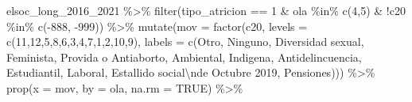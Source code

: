 \documentclass[
  12pt,
]{book}
\newenvironment{Shaded}{\begin{snugshade}}{\end{snugshade}}
\newcommand{\AttributeTok}[1]{\textcolor[rgb]{0.77,0.63,0.00}{#1}}
\newcommand{\ConstantTok}[1]{\textcolor[rgb]{0.00,0.00,0.00}{#1}}
\newcommand{\DecValTok}[1]{\textcolor[rgb]{0.00,0.00,0.81}{#1}}
\newcommand{\FunctionTok}[1]{\textcolor[rgb]{0.00,0.00,0.00}{#1}}
\newcommand{\NormalTok}[1]{#1}
\newcommand{\SpecialCharTok}[1]{\textcolor[rgb]{0.00,0.00,0.00}{#1}}
\newcommand{\StringTok}[1]{\textcolor[rgb]{0.31,0.60,0.02}{#1}}
\begin{document}
\begin{Shaded}
\begin{Highlighting}[]
\NormalTok{elsoc\_long\_2016\_2021 }\SpecialCharTok{\%\textgreater{}\%}
  \FunctionTok{filter}\NormalTok{(tipo\_atricion }\SpecialCharTok{==} \DecValTok{1} \SpecialCharTok{\&}\NormalTok{ ola }\SpecialCharTok{\%in\%} \FunctionTok{c}\NormalTok{(}\DecValTok{4}\NormalTok{,}\DecValTok{5}\NormalTok{) }\SpecialCharTok{\&} \SpecialCharTok{!}\NormalTok{c20 }\SpecialCharTok{\%in\%} \FunctionTok{c}\NormalTok{(}\SpecialCharTok{{-}}\DecValTok{888}\NormalTok{, }\SpecialCharTok{{-}}\DecValTok{999}\NormalTok{)) }\SpecialCharTok{\%\textgreater{}\%}
  \FunctionTok{mutate}\NormalTok{(}\AttributeTok{mov =} \FunctionTok{factor}\NormalTok{(c20, }\AttributeTok{levels =} \FunctionTok{c}\NormalTok{(}\DecValTok{11}\NormalTok{,}\DecValTok{12}\NormalTok{,}\DecValTok{5}\NormalTok{,}\DecValTok{8}\NormalTok{,}\DecValTok{6}\NormalTok{,}\DecValTok{3}\NormalTok{,}\DecValTok{4}\NormalTok{,}\DecValTok{7}\NormalTok{,}\DecValTok{1}\NormalTok{,}\DecValTok{2}\NormalTok{,}\DecValTok{10}\NormalTok{,}\DecValTok{9}\NormalTok{),}
                         \AttributeTok{labels =} \FunctionTok{c}\NormalTok{(}\StringTok{\textquotesingle{}Otro\textquotesingle{}}\NormalTok{,}
                                    \StringTok{\textquotesingle{}Ninguno\textquotesingle{}}\NormalTok{,}
                                    \StringTok{\textquotesingle{}Diversidad sexual\textquotesingle{}}\NormalTok{,}
                                    \StringTok{\textquotesingle{}Feminista\textquotesingle{}}\NormalTok{,}
                                    \StringTok{\textquotesingle{}Provida o Antiaborto\textquotesingle{}}\NormalTok{,}
                                    \StringTok{\textquotesingle{}Ambiental\textquotesingle{}}\NormalTok{,}
                                    \StringTok{\textquotesingle{}Indigena\textquotesingle{}}\NormalTok{,}
                                    \StringTok{\textquotesingle{}Antidelincuencia\textquotesingle{}}\NormalTok{,}
                                    \StringTok{\textquotesingle{}Estudiantil\textquotesingle{}}\NormalTok{,}
                                    \StringTok{\textquotesingle{}Laboral\textquotesingle{}}\NormalTok{,}
                                    \StringTok{\textquotesingle{}Estallido social}\SpecialCharTok{\textbackslash{}n}\StringTok{de Octubre 2019\textquotesingle{}}\NormalTok{,}
                                    \StringTok{\textquotesingle{}Pensiones\textquotesingle{}}\NormalTok{))) }\SpecialCharTok{\%\textgreater{}\%}
  \FunctionTok{prop}\NormalTok{(}\AttributeTok{x =}\NormalTok{ mov, }\AttributeTok{by =}\NormalTok{ ola, }\AttributeTok{na.rm =} \ConstantTok{TRUE}\NormalTok{) }\SpecialCharTok{\%\textgreater{}\%} 

\end{Highlighting}
\end{Shaded}
\end{document}
